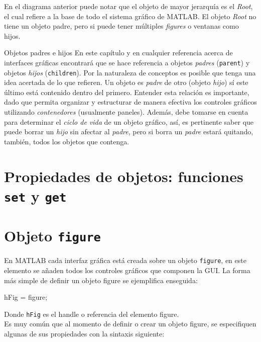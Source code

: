 En el diagrama anterior puede notar que el objeto de mayor jerarquía es
el \emph{Root}, el cual refiere a la base de todo el sistema gráfico de
MATLAB. El objeto \emph{Root} no tiene un objeto padre, pero si puede
tener múltiples \emph{figures} o ventanas como hijos. \\


\begin{informacion}{Objetos padres e hijos}
En este capítulo y en cualquier referencia acerca de
interfaces gráficas encontrará que se hace referencia a
objetos \emph{padres} (\texttt{parent}) y objetos 
\emph{hijos} (\texttt{children}). Por la naturaleza de conceptos es
posible que tenga  una idea acertada de lo que refieren.
Un objeto es \emph{padre} de otro (objeto \emph{hijo}) 
sí este último está contenido dentro del primero. Entender esta relación
es importante,  dado que permita organizar y estructurar
de manera efectiva los controles  gráficos utilizando
\emph{contenedores} (usualmente paneles). Además, debe tomarse
 en cuenta para determinar el \emph{ciclo de vida} de un
objeto gráfico, así, es  pertinente saber que puede
borrar un \emph{hijo} sin afectar al \emph{padre}, pero si borra
 un \emph{padre} estará quitando, también, todos los
objetos que contenga.
\end{informacion}


\section{Propiedades de objetos: funciones \texttt{set} y \texttt{get}}

\section{Objeto \texttt{figure}}

En MATLAB cada interfaz gráfica está creada sobre un objeto
\texttt{figure}, en este elemento se añaden todos los controles gráficos
que componen la GUI. La forma más simple de definir un objeto figure se
ejemplifica enseguida:

\begin{matlab}
hFig = figure;
\end{matlab}

Donde \texttt{hFig} es el handle o referencia del elemento figure.\\

Es muy común que al momento de definir o crear un objeto figure, se
especifiquen algunas de sus propiedades con la sintaxis siguiente:


